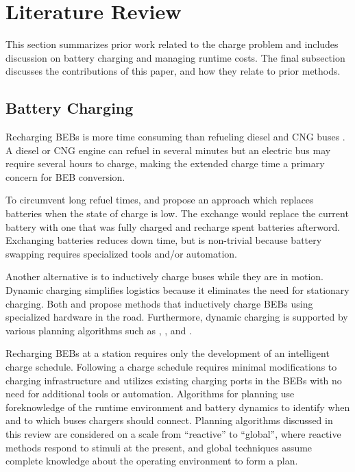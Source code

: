 \section{Literature Review}
\par This section summarizes prior work related to the charge problem and includes discussion on battery charging and managing runtime costs. The final subsection discusses the contributions of this paper, and how they relate to prior methods.
\subsection{Battery Charging}
Recharging BEBs is more time consuming than refueling diesel and CNG buses \cite{wei_optimizing_2018}. A diesel or CNG engine can refuel in several minutes but an electric bus may require several hours to charge, making the extended charge time a primary concern for BEB conversion.
\par To circumvent long refuel times, \cite{xian_zhang_optimal_2016} and \cite{jain_battery_2020} propose an approach which replaces batteries when the state of charge is low. The exchange would replace the current battery with one that was fully charged and recharge spent batteries afterword. Exchanging batteries reduces down time, but is non-trivial because battery swapping requires specialized tools and/or automation.
\par Another alternative is to inductively charge buses while they are in motion. Dynamic charging simplifies logistics because it eliminates the need for stationary charging. Both \cite{balde_electric_2019} and \cite{jeong_automatic_2018} propose methods that inductively charge BEBs using specialized hardware in the road. Furthermore, dynamic charging is supported by various planning algorithms such as \cite{csonka_optimization_2021}, \cite{Alwesabi_2021_Novel}, and  \cite{Alwesabi_2022_Robust}.
\par Recharging BEBs at a station 
requires only the development of an intelligent charge schedule. Following a charge schedule requires minimal modifications to charging infrastructure and utilizes existing charging ports in the BEBs with no need for additional tools or automation. Algorithms for planning use foreknowledge of the runtime environment and battery dynamics to identify when and to which buses chargers should connect. Planning algorithms discussed in this review are considered on a scale from ``reactive'' to ``global'', where reactive methods respond to stimuli at the present, and global techniques assume complete knowledge about the operating environment to form a plan.
